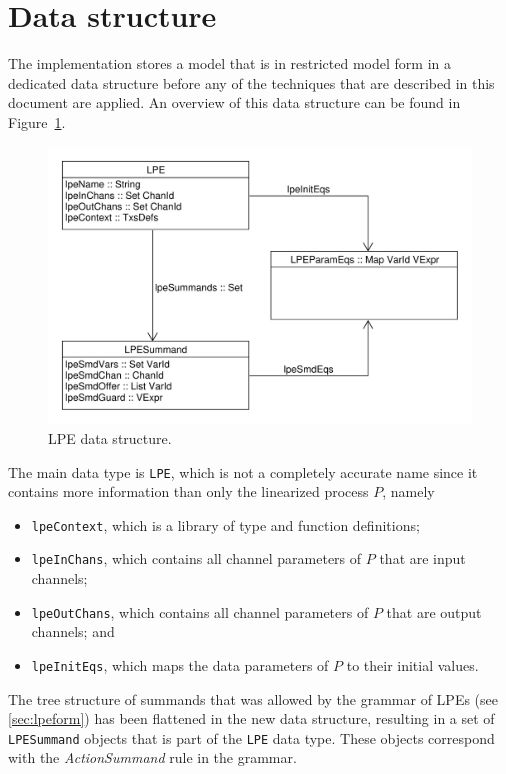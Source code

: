 \section{Data structure}

The implementation stores a \txs{} model that is in restricted model form in a dedicated data structure before any of the techniques that are described in this document are applied.
An overview of this data structure can be found in Figure~\ref{fig:lpedatastructure}.

\begin{figure}[!ht]
\begin{center}
\includegraphics[width=0.7\linewidth]{images/lpe-types}
\caption{LPE data structure.}
\label{fig:lpedatastructure}
\end{center}
\end{figure}

The main data type is \texttt{LPE}, which is not a completely accurate name since it contains more information than only the linearized \txs{} process $P$, namely

\begin{itemize}
\item \texttt{lpeContext}, which is a library of \txs{} type and function definitions;
\item \texttt{lpeInChans}, which contains all channel parameters of $P$ that are input channels;
\item \texttt{lpeOutChans}, which contains all channel parameters of $P$ that are output channels; and
\item \texttt{lpeInitEqs}, which maps the data parameters of $P$ to their initial values.
\end{itemize}

The tree structure of summands that was allowed by the grammar of LPEs (see \ref{sec:lpeform}) has been flattened in the new data structure, resulting in a set of \texttt{LPESummand} objects that is part of the \texttt{LPE} data type.
These objects correspond with the \textit{ActionSummand} rule in the grammar.

